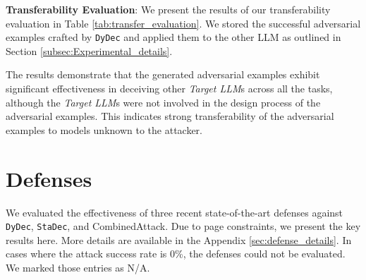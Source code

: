 \documentclass[11pt]{article}
\newcommand \dydec[0]{\texttt{DyDec}}
\newcommand \stadec[0]{\texttt{StaDec}}
\newcommand \targetLLM[0]{\textsl{Target LLM}}
\begin{document}
\vspace{0.05cm}
\noindent \textbf{Transferability Evaluation}: We present the results of our transferability evaluation in Table \ref{tab:transfer_evaluation}. We stored the successful adversarial examples crafted by \dydec{} and applied them to the other LLM as outlined in Section \ref{subsec:Experimental_details}.
\begin{table}[tbp]
\centering
\small
{}
\caption{Attack Success Rate (\%) in Transferability Evaluation}
\label{tab:transfer_evaluation}
\end{table}

The results demonstrate that the generated adversarial examples exhibit significant effectiveness in deceiving other \targetLLM{}s across all the tasks, although the \targetLLM{}s were not involved in the design process of the adversarial examples. This indicates strong transferability of the adversarial examples to models unknown to the attacker.






\section{Defenses}
\label{sec:defenses}
We evaluated the effectiveness of three recent state-of-the-art defenses against \dydec{}, \stadec{}, and CombinedAttack. Due to page constraints, we present the key results here. More details are available in the Appendix \ref{sec:defense_details}. In cases where the attack success rate is 0\%, the defenses could not be evaluated. We marked those entries as N/A.
\end{document}
